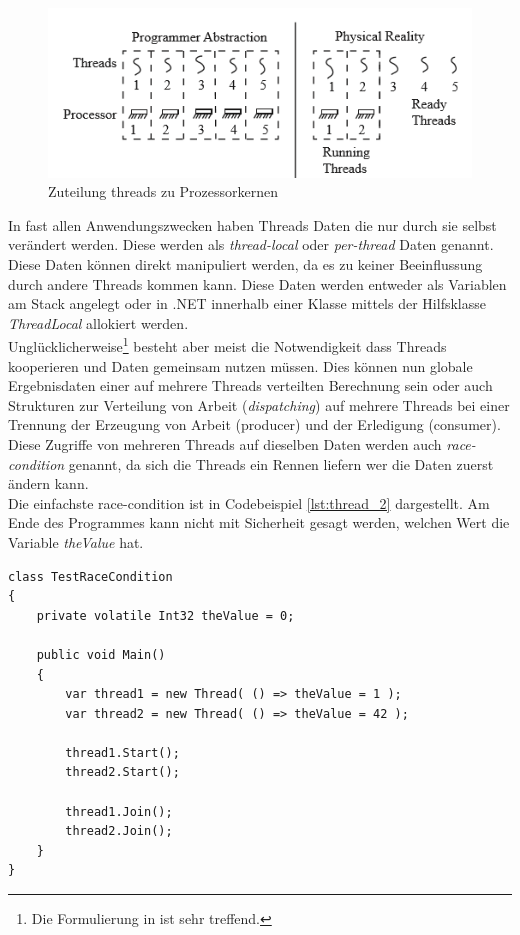\begin{figure}
	\centering
	\includegraphics[width=0.7\linewidth]{images/threads_cores.png}
	\caption{Zuteilung threads zu Prozessorkernen\parencite[S. 140]{Dahlin2012}}
	\label{fig:threads_cores}
\end{figure}

In fast allen Anwendungszwecken haben Threads Daten die nur durch sie selbst verändert werden. Diese werden als \emph{thread-local} oder \emph{per-thread} Daten genannt. Diese Daten können direkt manipuliert werden, da es zu keiner Beeinflussung durch andere Threads kommen kann. Diese Daten werden entweder als Variablen am Stack angelegt oder in .NET innerhalb einer Klasse mittels der Hilfsklasse \textit{ThreadLocal} allokiert werden\parencite{ms_threadlocal}. 
\\Unglücklicherweise\footnote{Die Formulierung in \parencite[S. 179]{Dahlin2012} ist sehr treffend.} besteht aber meist die Notwendigkeit dass Threads kooperieren und Daten gemeinsam nutzen müssen. Dies können nun globale Ergebnisdaten einer auf mehrere Threads verteilten Berechnung sein oder auch Strukturen zur Verteilung von Arbeit (\textit{dispatching}) auf mehrere Threads bei einer Trennung der Erzeugung von Arbeit (producer) und der Erledigung (consumer). Diese Zugriffe von mehreren Threads auf dieselben Daten werden auch \emph{race-condition} genannt, da sich die Threads ein Rennen liefern wer die Daten zuerst ändern kann.
\\Die einfachste race-condition ist in Codebeispiel \ref{lst:thread_2} dargestellt\parencite[S. 182]{Dahlin2012}. Am Ende des Programmes kann nicht mit Sicherheit gesagt werden, welchen Wert die Variable \textit{theValue} hat.

\begin{lstlisting}[caption={Thread race-condition},label={lst:thread_2},captionpos=b]
class TestRaceCondition
{
	private volatile Int32 theValue = 0;
	
	public void Main()
	{
        var thread1 = new Thread( () => theValue = 1 );
		var thread2 = new Thread( () => theValue = 42 );

		thread1.Start();
		thread2.Start();

		thread1.Join();
		thread2.Join();
	}
}
\end{lstlisting}

